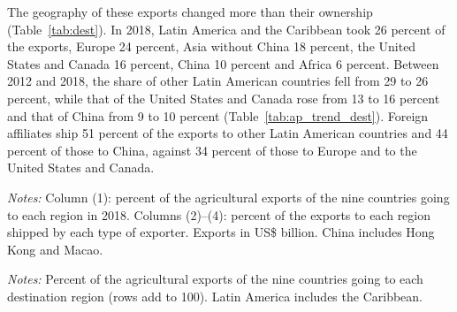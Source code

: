 The geography of these exports changed more than their ownership (Table~\ref{tab:dest}). In 2018, Latin America
and the Caribbean took 26 percent of the exports, Europe 24 percent, Asia without China 18 percent, the United States
and Canada 16 percent, China 10 percent and Africa 6 percent. Between 2012 and 2018, the share of other Latin American
countries fell from 29 to 26 percent, while that of the United States and Canada rose from 13 to 16 percent and that
of China from 9 to 10 percent (Table~\ref{tab:ap_trend_dest}). Foreign affiliates ship 51 percent of the exports to
other Latin American countries and 44 percent of those to China, against 34 percent of those to Europe and to the
United States and Canada.
\begin{table}[htbp]
\centering
\caption{Agricultural exports and ownership, by destination region, 2018}
\label{tab:dest}
{\small\setlength{\tabcolsep}{4pt}\setlength{\extrarowheight}{1pt}
}

\begin{minipage}{0.95\linewidth}
\notesize
\vspace{0.6em}
\textit{Notes:} Column (1): percent of the agricultural exports of the nine countries going to each region in 2018. Columns (2)--(4): percent of the exports to each region shipped by each type of exporter. Exports in US\$ billion. China includes Hong Kong and Macao.\\
\srcnote
\end{minipage}
\end{table}
\begin{table}[htbp]
\centering
\caption{Destination of agricultural exports, 2012--2018}
\label{tab:ap_trend_dest}
{\footnotesize\setlength{\tabcolsep}{3pt}\setlength{\extrarowheight}{1pt}
}

\begin{minipage}{0.95\linewidth}
\notesize
\vspace{0.6em}
\textit{Notes:} Percent of the agricultural exports of the nine countries going to each destination region (rows add to 100). Latin America includes the Caribbean.\\
\srcnote
\end{minipage}
\end{table}

